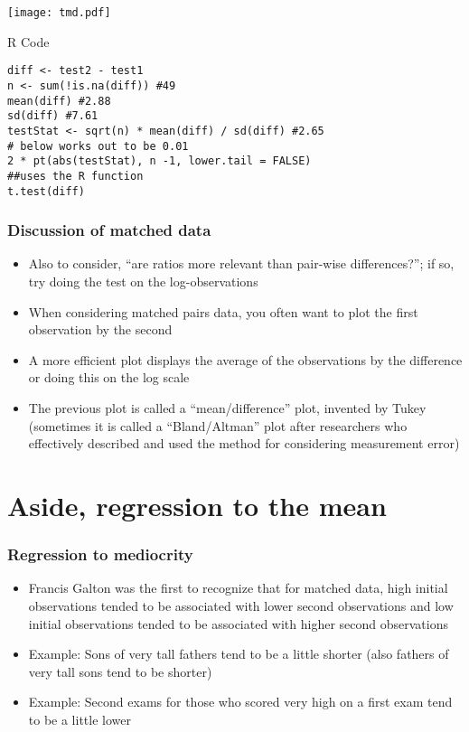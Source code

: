 \documentclass[aspectratio=169]{beamer}
\begin{document}
\begin{frame}
\begin{center}
  \texttt{[image: tmd.pdf]}
\end{center}
\end{frame}

\begin{frame}[fragile]
R Code
\begin{verbatim}
diff <- test2 - test1
n <- sum(!is.na(diff)) #49
mean(diff) #2.88
sd(diff) #7.61
testStat <- sqrt(n) * mean(diff) / sd(diff) #2.65
# below works out to be 0.01
2 * pt(abs(testStat), n -1, lower.tail = FALSE) 
##uses the R function
t.test(diff)
\end{verbatim}  
\end{frame}

\begin{frame}\frametitle{Discussion of matched data}
  \begin{itemize}
  \item Also to consider, ``are ratios more relevant than pair-wise
    differences?''; if so, try doing the test on the log-observations
  \item When considering matched pairs data, you often want to plot the first observation by the second
  \item A more efficient plot displays the average of the observations by the difference or doing this on the log scale
  \item The previous plot is called a ``mean/difference'' plot,
    invented by Tukey (sometimes it is called a ``Bland/Altman'' plot
    after researchers who effectively described and used the method
    for considering measurement error)
  \end{itemize}
\end{frame}

\section{Aside,  regression to the mean}
\begin{frame} \frametitle{Regression to mediocrity}
  \begin{itemize}
  \item Francis Galton was the first to recognize that for matched
    data, high initial observations tended to be associated with lower
    second observations and low initial observations tended to be
    associated with higher second observations
  \item Example: Sons of very tall fathers tend to be a little shorter
    (also fathers of very tall sons tend to be shorter)
  \item Example: Second exams for those who scored very high on a
    first exam tend to be a little lower
  \end{itemize}
\end{frame}
\end{document}

